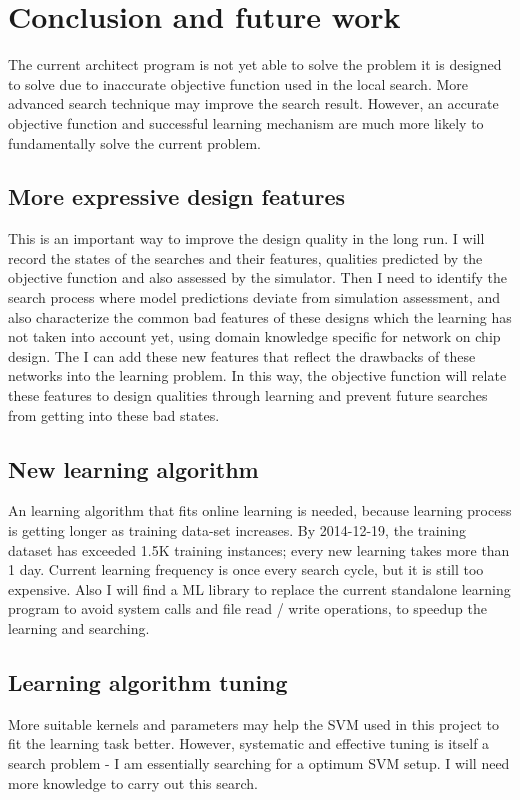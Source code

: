 \documentclass[12pt]{article}
\theoremstyle{definition}
\begin{document}
\section{Conclusion and future work}
The current architect program is not yet able to solve the problem it is designed to solve due to inaccurate objective function used in the local search. More advanced search technique may improve the search result. However, an accurate objective function and successful learning mechanism are much more likely to fundamentally solve the current problem.
\subsection{More expressive design features}
This is an important way to improve the design quality in the long run. I will record the states of the searches and their features, qualities predicted by the objective function and also assessed by the simulator. Then I need to identify the search process where model predictions deviate from simulation assessment, and also characterize the common bad features of these designs which the learning has not taken into account yet, using domain knowledge specific for network on chip design. The I can add these new features that reflect the drawbacks of these networks into the learning problem. In this way, the objective function will relate these features to design qualities through learning and prevent future searches from getting into these bad states.
\subsection{New learning algorithm}
An learning algorithm that fits online learning is needed, because learning process is getting longer as training data-set increases. By 2014-12-19, the training dataset has exceeded 1.5K training instances; every new learning takes more than 1 day. Current learning frequency is once every search cycle, but it is still too expensive. Also I will find a ML library to replace the current standalone learning program to avoid system calls and file read / write operations, to speedup the learning and searching.
\subsection{Learning algorithm tuning}
More suitable kernels and parameters may help the SVM used in this project to fit the learning task better. However, systematic and effective tuning is itself a search problem - I am essentially searching for a optimum SVM setup. I will need more knowledge to carry out this search.
\end{document}
